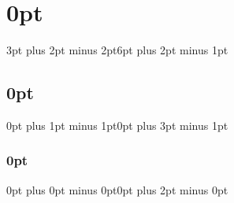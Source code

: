         \titlespacing\section{0pt}{3pt plus 2pt minus 2pt}{6pt plus 2pt minus 1pt}
        \titlespacing\subsection{0pt}{0pt plus 1pt minus 1pt}{0pt plus 3pt minus 1pt}
		\titlespacing\subsubsection{0pt}{0pt plus 0pt minus 0pt}{0pt plus 2pt minus 0pt}

        



